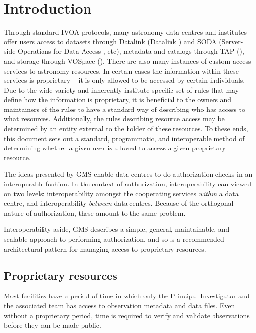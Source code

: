 \documentclass[11pt,a4paper]{ivoa}
\begin{document}
\section{Introduction}

Through standard IVOA protocols, many astronomy data centres and institutes offer users access to datasets through Datalink (Datalink \citep{2015ivoa.spec.0617D}) and SODA (Server-side Operations for Data Access \citep{2017ivoa.spec.0517B}, etc), metadata and catalogs through TAP (\citep{2010ivoa.spec.0327D}), and storage through VOSpace (\citep{2018ivoa.spec.0621G}).  There are also many instances of custom access services to astronomy resources.  In certain cases the information within these services is proprietary -- it is only allowed to be accessed by certain individuals.  Due to the wide variety and inherently institute-specific set of rules that may define how the information is proprietary, it is beneficial to the owners and maintainers of the rules to have a standard way of describing who has access to what resources.  Additionally, the rules describing resource access may be determined by an entity external to the holder of these resources.  To these ends, this document sets out a standard, programmatic, and interoperable method of determining whether a given user is allowed to access a given proprietary resource.

The ideas presented by GMS enable data centres to do authorization checks in an interoperable fashion.  In the context of authorization, interoperability can viewed on two levels:  interoperability amongst the cooperating services \emph{within} a data centre, and interoperability \emph{between} data centres.  Because of the orthogonal nature of authorization, these amount to the same problem.

Interoperability aside, GMS describes a simple, general, maintainable, and scalable approach to performing authorization, and so is a recommended architectural pattern for managing access to proprietary resources.

\subsection{Proprietary resources}

Most facilities have a period of time in which only the Principal Investigator and the associated team has access to observation metadata and data files.  Even without a proprietary period, time is required to verify and validate observations before they can be made public.
\end{document}
